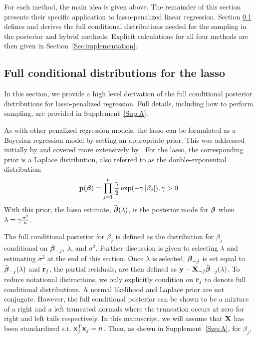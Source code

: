 For each method, the main idea is given above. The remainder of this section presents their specific application to lasso-penalized linear regression. Section \ref{Sec:full-cond} defines and derives the full conditional distributions needed for the sampling in the posterior and hybrid methods. Explicit calculations for all four methods are then given in Section~\ref{Sec:implementation}.

\subsection{Full conditional distributions for the lasso}
\label{Sec:full-cond}


In this section, we provide a high level derivation of the full conditional posterior distributions for lasso-penalized regression. Full details, including how to perform sampling, are provided in Supplement~\ref{Sup:A}.

As with other penalized regression models, the lasso can be formulated as a Bayesian regression model by setting an appropriate prior. This was addressed initially by \cite{Tibshirani1996} and covered more extensively by \cite{Park2008}. For the lasso, the corresponding prior is a Laplace distribution, also referred to as the double-exponential distribution: $$\mathbf{p}(\boldsymbol{\beta}) = \prod_{j = 1}^{p} \frac{\gamma}{2}\exp(-\gamma \left\lvert\beta_j\right\rvert), \gamma > 0.$$ With this prior, the lasso estimate, $\widehat{\boldsymbol{\beta}}(\lambda)$, is the posterior mode for $\boldsymbol{\beta}$ when $\lambda = \gamma \frac{\sigma^2}{n}$.

The full conditional posterior for $\beta_j$ is defined as the distribution for $\beta_j$ conditional on $\boldsymbol{\beta}_{-j}$, $\lambda$, and $\sigma^2$. Further discussion is given to selecting $\lambda$ and estimating $\sigma^2$ at the end of this section. Once $\lambda$ is selected, $\boldsymbol{\beta}_{-j}$ is set equal to $\hat{\boldsymbol{\beta}}_{-j}(\lambda)$ and $\mathbf{r}_{j}$, the partial residuals, are then defined as $\mathbf{y} - \mathbf{X}_{-j}\hat{\boldsymbol{\beta}}_{-j}(\lambda)$. To reduce notational distractions, we only explicitly condition on $\mathbf{r}_{j}$ to denote full conditional distributions. A normal likelihood and Laplace prior are not conjugate. However, the full conditional posterior can be shown to be a mixture of a right and a left truncated normals where the truncation occurs at zero for right and left tails respectively. In this manuscript, we will assume that $\mathbf{X}$ has been standardized s.t. $\mathbf{x}_j^T\mathbf{x}_j = n$. Then, as shown in Supplement~\ref{Sup:A}, for $\beta_j$,

